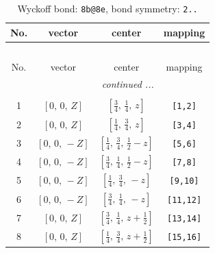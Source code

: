 \documentclass[fleqn,8pt]{jsarticle}
\begin{document}
\begin{longtable}{cccc}
\caption{Wyckoff bond: {\tt 8b@8e}, bond symmetry: {\tt 2..}}
 \\
 \hline \hline
No. & vector & center & mapping \\ \hline \endfirsthead

\multicolumn{3}{l}{\tablename\ \thetable{}} \\
 \hline \hline
No. & vector & center & mapping \\ \hline \endhead

 \hline \hline
\multicolumn{3}{r}{\footnotesize\it continued ...} \\ \endfoot

 \hline \hline
\multicolumn{3}{r}{} \\ \endlastfoot

1 & $\left[ 0,\, 0,\, Z \right]$ & $\left[ \frac{3}{4},\, \frac{1}{4},\, z \right]$ & {\tt [1,2]} \\ \hline
2 & $\left[ 0,\, 0,\, Z \right]$ & $\left[ \frac{1}{4},\, \frac{3}{4},\, z \right]$ & {\tt [3,4]} \\ \hline
3 & $\left[ 0,\, 0,\, - Z \right]$ & $\left[ \frac{1}{4},\, \frac{3}{4},\, \frac{1}{2} - z \right]$ & {\tt [5,6]} \\ \hline
4 & $\left[ 0,\, 0,\, - Z \right]$ & $\left[ \frac{3}{4},\, \frac{1}{4},\, \frac{1}{2} - z \right]$ & {\tt [7,8]} \\ \hline
5 & $\left[ 0,\, 0,\, - Z \right]$ & $\left[ \frac{1}{4},\, \frac{3}{4},\, - z \right]$ & {\tt [9,10]} \\ \hline
6 & $\left[ 0,\, 0,\, - Z \right]$ & $\left[ \frac{3}{4},\, \frac{1}{4},\, - z \right]$ & {\tt [11,12]} \\ \hline
7 & $\left[ 0,\, 0,\, Z \right]$ & $\left[ \frac{3}{4},\, \frac{1}{4},\, z + \frac{1}{2} \right]$ & {\tt [13,14]} \\ \hline
8 & $\left[ 0,\, 0,\, Z \right]$ & $\left[ \frac{1}{4},\, \frac{3}{4},\, z + \frac{1}{2} \right]$ & {\tt [15,16]} \\
\end{longtable}
\renewcommand{\arraystretch}{1.2}
\end{document}

